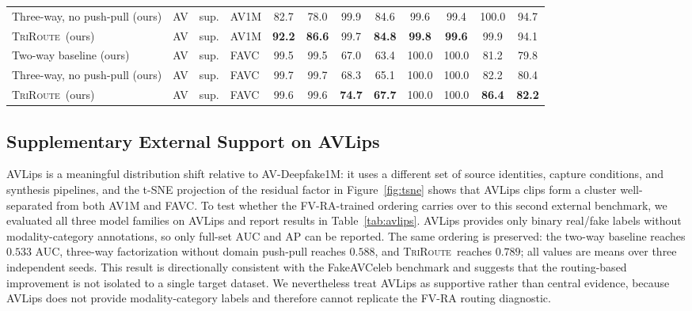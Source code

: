 \documentclass{article}
\newcommand{\method}{\textsc{TriRoute}}
\begin{document}
\begin{table}[t]
{\begin{tabular}{llllcccccccc}
        Three-way, no push-pull (ours)   & AV & sup. & AV1M & 82.7 & 78.0 & 99.9 & 84.6 & 99.6 & 99.4 & 100.0 & 94.7 \\
        \method\ (ours)                  & AV & sup. & AV1M & \textbf{92.2} & \textbf{86.6} & 99.7 & \textbf{84.8} & \textbf{99.8} & \textbf{99.6} & 99.9 & 94.1 \\
        \midrule
        Two-way baseline (ours)          & AV & sup. & FAVC & 99.5 & 99.5 & 67.0 & 63.4 & 100.0 & 100.0 & 81.2 & 79.8 \\
        Three-way, no push-pull (ours)   & AV & sup. & FAVC & 99.7 & 99.7 & 68.3 & 65.1 & 100.0 & 100.0 & 82.2 & 80.4 \\
        \method\ (ours)                  & AV & sup. & FAVC & 99.6 & 99.6 & \textbf{74.7} & \textbf{67.7} & 100.0 & 100.0 & \textbf{86.4} & \textbf{82.2} \\
        \bottomrule
    \end{tabular}}
\end{table}

\subsection{Supplementary External Support on AVLips}

AVLips is a meaningful distribution shift relative to AV-Deepfake1M: it uses a different set of source identities, capture conditions, and synthesis pipelines, and the t-SNE projection of the residual factor in Figure~\ref{fig:tsne} shows that AVLips clips form a cluster well-separated from both AV1M and FAVC. To test whether the FV-RA-trained ordering carries over to this second external benchmark, we evaluated all three model families on AVLips \citep{shi2022avhubert} and report results in Table~\ref{tab:avlips}. AVLips provides only binary real/fake labels without modality-category annotations, so only full-set AUC and AP can be reported. The same ordering is preserved: the two-way baseline reaches $0.533$ AUC, three-way factorization without domain push-pull reaches $0.588$, and \method\ reaches $0.789$; all values are means over three independent seeds. This result is directionally consistent with the FakeAVCeleb benchmark and suggests that the routing-based improvement is not isolated to a single target dataset. We nevertheless treat AVLips as supportive rather than central evidence, because AVLips does not provide modality-category labels and therefore cannot replicate the FV-RA routing diagnostic.
\end{document}
